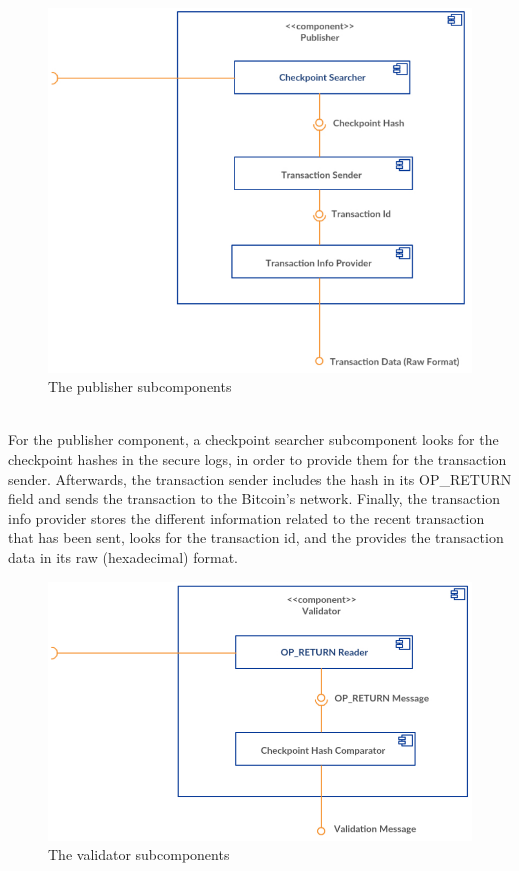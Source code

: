 \begin{figure}[htp]
    \centering
    \includegraphics[scale=0.38]{comps1}
    \caption{The publisher subcomponents}
\end{figure}\\
For the publisher component, a checkpoint searcher subcomponent looks for the checkpoint hashes in the secure logs, in order to provide them for the transaction sender. Afterwards, the transaction sender includes the hash in its OP\_RETURN field and sends the transaction to the Bitcoin's network. Finally, the transaction info provider stores the different information related to the recent transaction that has been sent, looks for the transaction id, and the provides the transaction data in its raw (hexadecimal) format.
\newpage
\begin{figure}[htp]
    \centering
    \includegraphics[scale=0.37]{comps2}
    \caption{The validator subcomponents}
\end{figure}
